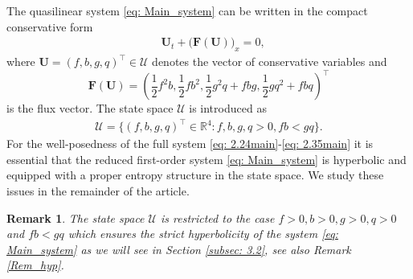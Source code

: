\documentclass[11pt]{article}
\numberwithin{equation}{section}
\newtheorem{counter example}[theorem]{Counter Example}
\newtheorem{remark}[theorem] {Remark}
\begin{document}
{The quasilinear system \eqref{eq: Main_system} can be written in the compact conservative form 
\begin{align}
&\mathbf{U}_t+(\mathbf{F}{(\mathbf{U}))}_x=0,\label{conservation-laws}
\end{align}
where $\mathbf{U}=(f,b,g,q)^{\top}\in \mathcal{U}$ denotes the vector of conservative variables and 
\[\mathbf{F}(\mathbf{U})=\left(\frac 12 f^2b,\frac 12fb^2,\frac 12 g^2q+fbg,\frac 12 gq^2+fbq\right)^{\top}\]
is the flux vector. The state space $\mathcal{U}$ is introduced as
\begin{align}\label{statespace}
    \mathcal{U}= \Big\{(f, b, g, q)^\top\in \mathbb{R}^4: f, b, g, q>0, fb<gq \Big\}.
\end{align}
For the well-posedness of the full system \eqref{eq: 2.24main}-\eqref{eq: 2.35main} it is essential that the reduced first-order system \eqref{eq: Main_system} is hyperbolic and equipped with a proper entropy structure
in the state space. We study these issues in the 
remainder of the article.

\begin{remark}
The state space $\mathcal{U}$ is restricted to the case $f>0, b>0, g>0, q>0$ and $fb<gq$ which ensures the strict hyperbolicity of the system \eqref{eq: Main_system} as we will see in Section \ref{subsec: 3.2}, see also Remark 
\ref{Rem_hyp}.
\end{remark}
}
\end{document}
